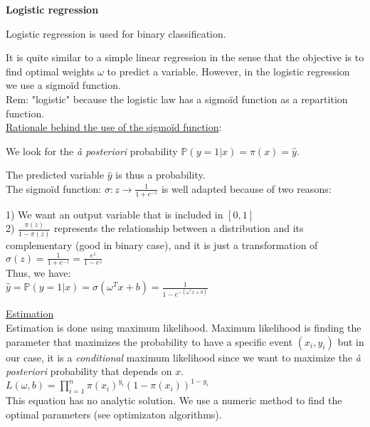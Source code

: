 {\fontsize{12pt}{22pt} \textbf{Logistic regression}\par}

\vspace{5mm}

Logistic regression is used for binary classification.

It is quite similar to a simple linear regression in the sense that the objective is to find optimal weights $\omega$ to predict a variable. However, in the logistic regression we use a sigmoïd function.\\

Rem: "logistic" because the logistic law has a sigmoïd function as a repartition function.\\

\underline{Rationale behind the use of the sigmoïd function}:

We look for the \textit{à posteriori} probability $\mathbb{P}(y=1 | x) = \pi (x) = \hat{y}$.

The predicted variable $\hat{y}$ is thus a probability.  \\

The sigmoïd function: $\sigma: z \to \frac{1}{1+e^{-z}}$ is well adapted because of two reasons:

1) We want an output variable that is included in $[0,1]$ \\
2) $\frac{\pi(z)}{1-\pi(z)}$ represents the relationship between a distribution and its complementary (good in binary case), and it is just a transformation of $\sigma(z)=\frac{1}{1+e^{-z}}=\frac{e^z}{1-e^z}$ \\

Thus, we have: \\
$\hat{y} = \mathbb{P}(y=1 | x) = \sigma(\omega ^Tx + b) = \frac{1}{1-e^{-(\omega ^Tx + b)}}$

\vspace{5mm}

\underline{Estimation} \\
Estimation is done using maximum likelihood. Maximum likelihood is finding the parameter that maximizes the probability to have a specific event $(x_i, y_i)$ but in our case, it is a \textit{conditional} maximum likelihood since we want to maximize the \textit{à posteriori} probability that depends on $x$. \\

$L(\omega, b) = \prod_{i=1}^n \pi(x_i)^{y_i}(1-\pi(x_i))^{1-y_i}$ \\

This equation has no analytic solution. We use a numeric method to find the optimal parameters (see optimizaton algorithms).